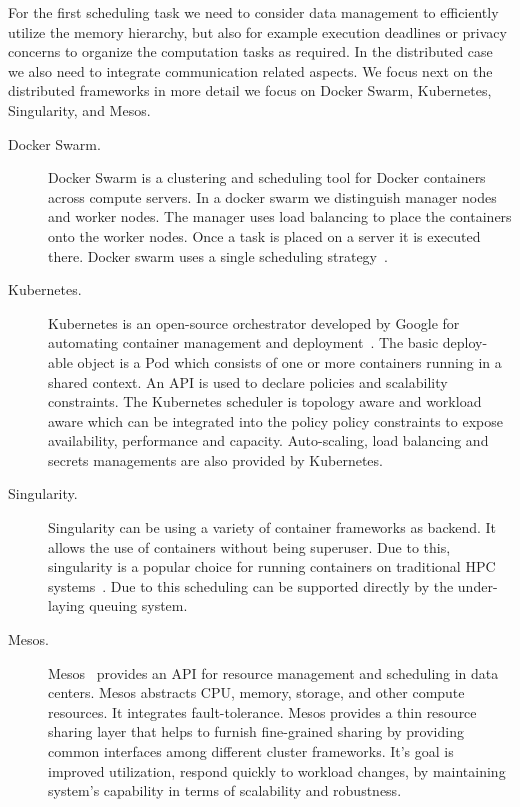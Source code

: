 \documentclass[final,5p,times,twocolumn]{elsarticle}
\begin{document}
For the first scheduling task we need to consider data management to
efficiently utilize the memory hierarchy, but also for example
execution deadlines or privacy concerns to organize the computation
tasks as required. In the distributed case we also need to integrate
communication related aspects. We focus next on the distributed
frameworks in more detail we focus on Docker Swarm, Kubernetes,
Singularity, and Mesos.

\begin{description}


\item[Docker Swarm.] Docker Swarm is a clustering and scheduling
tool for Docker containers~\cite{Dockerswarmengine2018} across compute
servers. In a docker swarm we distinguish manager nodes and worker
nodes. The manager uses load balancing to place the containers onto
the worker nodes. Once a task is placed on a server it is executed
there.  Docker swarm uses a single scheduling
strategy~\cite{Dockerswarm2018}.



\item[Kubernetes.] Kubernetes is an open-source orchestrator
developed by Google for automating container management and
deployment~\cite{Kubernates2018}. The basic deploy-able object is a
Pod which consists of one or more containers running in a shared
context. An API is used to declare policies and scalability
constraints. The Kubernetes scheduler is topology aware and workload
aware which can be integrated into the policy policy constraints to
expose availability, performance and capacity. Auto-scaling, load
balancing and secrets managements are also provided by Kubernetes.

\item[Singularity.] Singularity can be using a variety of
container frameworks as backend. It allows the use of containers
without being superuser. Due to this, singularity is a popular choice
for running containers on traditional HPC
systems~\cite{www-singularity}. Due to this scheduling can be
supported directly by the under-laying queuing system.


\item[Mesos.] Mesos~\cite{hindman2011mesos,Mesos2018} provides an
API for resource management and scheduling in data centers. Mesos
abstracts CPU, memory, storage, and other compute resources. It
integrates fault-tolerance. Mesos provides a thin resource sharing
layer that helps to furnish fine-grained sharing by providing common
interfaces among different cluster frameworks. It's goal is improved
utilization, respond quickly to workload changes, by maintaining
system's capability in terms of scalability and robustness.



\end{description}
\end{document}
